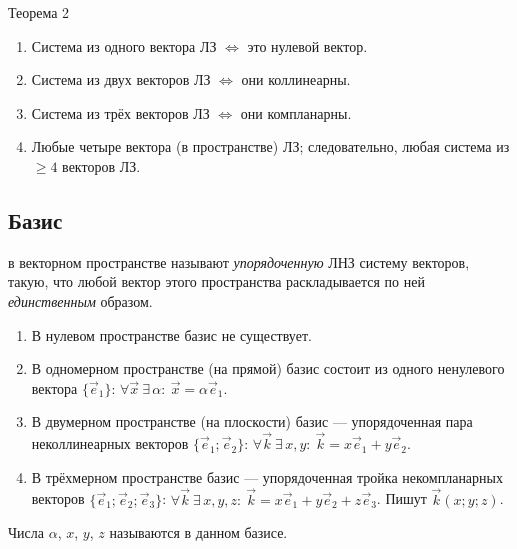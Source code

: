 \documentclass[11pt,a4paper]{article}
\begin{document}
\begin{kob}{Теорема 2}
\begin{enumerate}
\item Система из одного вектора ЛЗ $\iff$ это нулевой вектор.
\item Система из двух векторов ЛЗ $\iff$ они коллинеарны.
\item Система из трёх векторов ЛЗ $\iff$ они компланарны.
\item Любые четыре вектора (в пространстве) ЛЗ; следовательно, любая система из $\geqslant4$ векторов ЛЗ.
\end{enumerate}
\end{kob}

\subsection{Базис}

\begin{opr}
 в векторном пространстве называют \emph{упорядоченную} ЛНЗ систему векторов, такую, что любой вектор
этого пространства раскладывается по ней \emph{единственным} образом.
\end{opr}

\begin{enumerate}
\item В нулевом пространстве базис не существует.
\item В одномерном пространстве (на прямой) базис состоит из одного ненулевого вектора $\{\vec e_1\}$:
$\forall\vec x\ \exists\,\alpha:\ \vec x=\alpha\vec e_1$.
\item В двумерном пространстве (на плоскости) базис — упорядоченная пара неколлинеарных векторов $\{\vec e_1;\vec e_2\}$:
$\forall\vec k\ \exists\,x,y:\ \vec k=x\vec e_1+y\vec e_2$.
\item В трёхмерном пространстве базис — упорядоченная тройка некомпланарных векторов $\{\vec e_1;\vec e_2;\vec e_3\}$:
$\forall\vec k\ \exists\,x,y,z:\ \vec k=x\vec e_1+y\vec e_2+z\vec e_3$. Пишут $\vec k(x;y;z)$.
\end{enumerate}
Числа $\alpha$, $x$, $y$, $z$ называются  в данном базисе.
\end{document}

